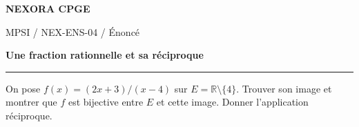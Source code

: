\documentclass[11pt,a4paper]{article}
\begin{document}
{\small\bfseries\color{nexorablue} NEXORA CPGE}\par
{\small MPSI / NEX-ENS-04 / Énoncé}\par
{\LARGE\bfseries Une fraction rationnelle et sa réciproque}\par
\vspace{0.25em}\hrule\vspace{0.6em}

On pose $f(x)=(2x+3)/(x-4)$ sur $E=\mathbb R\setminus\{4\}$. Trouver son image et montrer que $f$ est bijective entre $E$ et cette image. Donner l’application réciproque.
\end{document}
